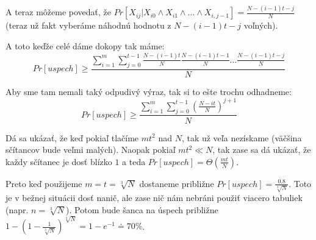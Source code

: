 A teraz môžeme povedať, že $Pr[X_{ij} | X_{i0} \land X_{i1} \land \dots \land X_{i,j-1}] = \frac{N - (i-1)t - j}{N}$
(teraz už fakt vyberáme náhodnú hodnotu z $N - (i-1)t - j$ voľných). 

A toto keďže celé dáme dokopy tak máme:
$$Pr[uspech] \geq \frac{\displaystyle\sum_{i=1}^m \displaystyle\sum_{j=0}^{t-1} \frac{N - (i-1)t}{N} \frac{N - (i-1)t - 1}{N} \dots \frac{N - (i-1)t - j}{N}}{N}$$

Aby sme tam nemali taký odpudivý výraz, tak si to ešte trochu odhadneme:
$$Pr[uspech] \geq \frac{\displaystyle\sum_{i=1}^m \displaystyle\sum_{j=0}^{t-1} \left ( \frac{N - it}{N} \right )^{j+1}}{N}$$

Dá sa ukázať, že keď pokiaľ tlačíme $mt^2$ nad $N$, tak už veľa nezískame (väčšina sčítancov bude veľmi malých).
Naopak pokiaľ $mt^2 \ll N$, tak zase sa dá ukázať, že každy sčítanec je dosť blízko $1$ a teda $Pr[uspech] = \Theta\left(\frac{mt}{N}\right)$.

Preto keď použijeme $m=t=\sqrt[3]{N}$ dostaneme približne $Pr[uspech] = \frac{0.8}{\sqrt[3]{N}}$. Toto je v bežnej situácii
dosť nanič, ale zase nič nám nebráni použiť viacero tabuliek (napr. $n = \sqrt[3]{N}$). Potom bude šanca na úspech približne
$1 - (1 - \frac{1}{\sqrt[3]{N}})^{\sqrt[3]{N}} = 1-e^{-1} \doteq 70\%$.
